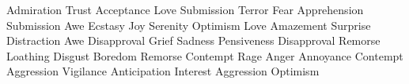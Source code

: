 {
\HL
{}
\NR
\HL
{}
\NC Admiration
\NC Trust
\NC Acceptance
\NC Love
\NC Submission
\NR
{}
\NC Terror
\NC Fear
\NC Apprehension
\NC Submission
\NC Awe
\NR
{}
\NC Ecstasy
\NC Joy
\NC Serenity
\NC Optimism
\NC Love
\NR
{}
\NC Amazement
\NC Surprise
\NC Distraction
\NC Awe
\NC Disapproval
\NR
{}
\NC Grief
\NC Sadness
\NC Pensiveness
\NC Disapproval
\NC Remorse
\NR
{}
\NC Loathing
\NC Disgust
\NC Boredom
\NC Remorse
\NC Contempt
\NR
{}
\NC Rage
\NC Anger
\NC Annoyance
\NC Contempt
\NC Aggression
\NR
{}
\NC Vigilance
\NC Anticipation
\NC Interest
\NC Aggression
\NC Optimism
\NR
\HL
\stoptabulate}